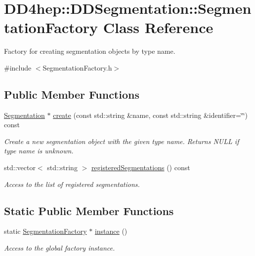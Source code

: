 \hypertarget{class_d_d4hep_1_1_d_d_segmentation_1_1_segmentation_factory}{
\section{DD4hep::DDSegmentation::SegmentationFactory Class Reference}
\label{class_d_d4hep_1_1_d_d_segmentation_1_1_segmentation_factory}
}


Factory for creating segmentation objects by type name.  


{\ttfamily \#include $<$SegmentationFactory.h$>$}\subsection*{Public Member Functions}
\begin{DoxyCompactItemize}
\item 
\hyperlink{class_d_d4hep_1_1_d_d_segmentation_1_1_segmentation}{Segmentation} $\ast$ \hyperlink{class_d_d4hep_1_1_d_d_segmentation_1_1_segmentation_factory_ad7f56347bdd4fd2e92df071166f29a40}{create} (const std::string \&name, const std::string \&identifier=\char`\"{}\char`\"{}) const 
\begin{DoxyCompactList}\small\item\em Create a new segmentation object with the given type name. Returns NULL if type name is unknown. \item\end{DoxyCompactList}\item 
std::vector$<$ std::string $>$ \hyperlink{class_d_d4hep_1_1_d_d_segmentation_1_1_segmentation_factory_ada61afcde940d71133c810dd4b4424e0}{registeredSegmentations} () const 
\begin{DoxyCompactList}\small\item\em Access to the list of registered segmentations. \item\end{DoxyCompactList}\end{DoxyCompactItemize}
\subsection*{Static Public Member Functions}
\begin{DoxyCompactItemize}
\item 
static \hyperlink{class_d_d4hep_1_1_d_d_segmentation_1_1_segmentation_factory}{SegmentationFactory} $\ast$ \hyperlink{class_d_d4hep_1_1_d_d_segmentation_1_1_segmentation_factory_a92954fdbd0bc642e5b594ef7f4ee3cfc}{instance} ()
\begin{DoxyCompactList}\small\item\em Access to the global factory instance. \item\end{DoxyCompactList}\end{DoxyCompactItemize}
